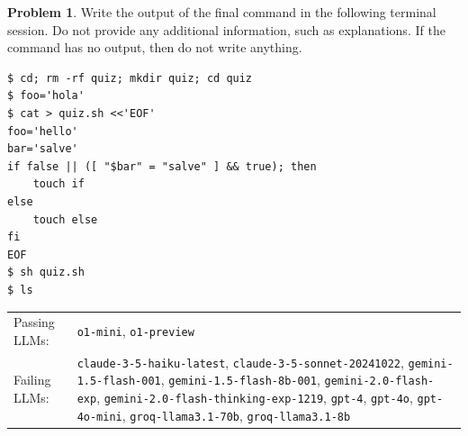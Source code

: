 \documentclass[10pt]{article}
\theoremstyle{definition}
\newtheorem{problem}{Problem}
\begin{document}
\noindent\vspace{0.1in}\begin{minipage}{\textwidth}

\begin{problem}
Write the output of the final command in the following terminal session.
Do not provide any additional information,
such as explanations.
If the command has no output,
then do not write anything.

\end{problem}
\begin{lstlisting}
$ cd; rm -rf quiz; mkdir quiz; cd quiz
$ foo='hola'
$ cat > quiz.sh <<'EOF'
foo='hello'
bar='salve'
if false || ([ "$bar" = "salve" ] && true); then
    touch if
else
    touch else
fi
EOF
$ sh quiz.sh
$ ls
\end{lstlisting}


\noindent
\begin{tabular}{p{1.0in}L{5in}}
Passing LLMs: & {\lstinline$o1-mini$}, {\lstinline$o1-preview$} \\
Failing LLMs: & {\lstinline$claude-3-5-haiku-latest$}, {\lstinline$claude-3-5-sonnet-20241022$}, {\lstinline$gemini-1.5-flash-001$}, {\lstinline$gemini-1.5-flash-8b-001$}, {\lstinline$gemini-2.0-flash-exp$}, {\lstinline$gemini-2.0-flash-thinking-exp-1219$}, {\lstinline$gpt-4$}, {\lstinline$gpt-4o$}, {\lstinline$gpt-4o-mini$}, {\lstinline$groq-llama3.1-70b$}, {\lstinline$groq-llama3.1-8b$} \\
\end{tabular}

\end{minipage}
\end{document}

